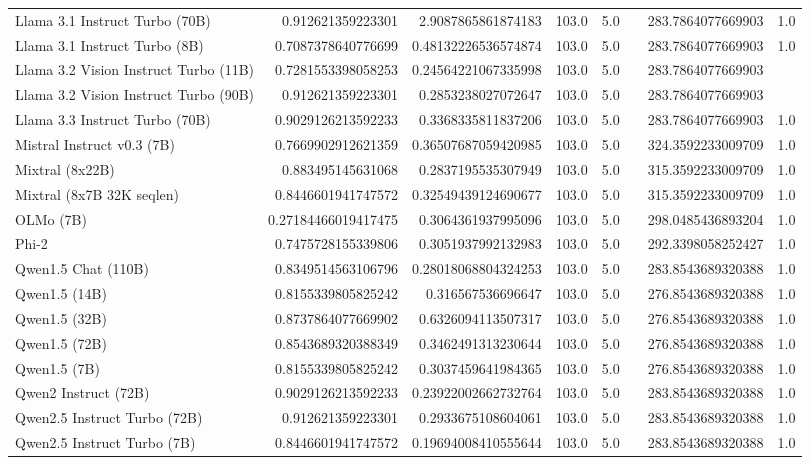 \begin{table}[htp]
{\begin{tabular}{lrrrrrrr}
Llama 3.1 Instruct Turbo (70B) & 0.912621359223301 & 2.9087865861874183 & 103.0 & 5.0 &  & 283.7864077669903 & 1.0 \\
Llama 3.1 Instruct Turbo (8B) & 0.7087378640776699 & 0.48132226536574874 & 103.0 & 5.0 &  & 283.7864077669903 & 1.0 \\
Llama 3.2 Vision Instruct Turbo (11B) & 0.7281553398058253 & 0.24564221067335998 & 103.0 & 5.0 &  & 283.7864077669903 &  \\
Llama 3.2 Vision Instruct Turbo (90B) & 0.912621359223301 & 0.2853238027072647 & 103.0 & 5.0 &  & 283.7864077669903 &  \\
Llama 3.3 Instruct Turbo (70B) & 0.9029126213592233 & 0.3368335811837206 & 103.0 & 5.0 &  & 283.7864077669903 & 1.0 \\
Mistral Instruct v0.3 (7B) & 0.7669902912621359 & 0.36507687059420985 & 103.0 & 5.0 &  & 324.3592233009709 & 1.0 \\
Mixtral (8x22B) & 0.883495145631068 & 0.2837195535307949 & 103.0 & 5.0 &  & 315.3592233009709 & 1.0 \\
Mixtral (8x7B 32K seqlen) & 0.8446601941747572 & 0.32549439124690677 & 103.0 & 5.0 &  & 315.3592233009709 & 1.0 \\
OLMo (7B) & 0.27184466019417475 & 0.3064361937995096 & 103.0 & 5.0 &  & 298.0485436893204 & 1.0 \\
Phi-2 & 0.7475728155339806 & 0.3051937992132983 & 103.0 & 5.0 &  & 292.3398058252427 & 1.0 \\
Qwen1.5 Chat (110B) & 0.8349514563106796 & 0.28018068804324253 & 103.0 & 5.0 &  & 283.8543689320388 & 1.0 \\
Qwen1.5 (14B) & 0.8155339805825242 & 0.316567536696647 & 103.0 & 5.0 &  & 276.8543689320388 & 1.0 \\
Qwen1.5 (32B) & 0.8737864077669902 & 0.6326094113507317 & 103.0 & 5.0 &  & 276.8543689320388 & 1.0 \\
Qwen1.5 (72B) & 0.8543689320388349 & 0.3462491313230644 & 103.0 & 5.0 &  & 276.8543689320388 & 1.0 \\
Qwen1.5 (7B) & 0.8155339805825242 & 0.3037459641984365 & 103.0 & 5.0 &  & 276.8543689320388 & 1.0 \\
Qwen2 Instruct (72B) & 0.9029126213592233 & 0.23922002662732764 & 103.0 & 5.0 &  & 283.8543689320388 & 1.0 \\
Qwen2.5 Instruct Turbo (72B) & 0.912621359223301 & 0.2933675108604061 & 103.0 & 5.0 &  & 283.8543689320388 & 1.0 \\
Qwen2.5 Instruct Turbo (7B) & 0.8446601941747572 & 0.19694008410555644 & 103.0 & 5.0 &  & 283.8543689320388 & 1.0 \\

\end{tabular}}
\end{table}
